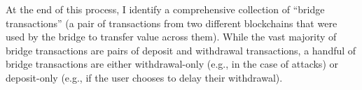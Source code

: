   At the end of this process, I identify a comprehensive collection
  of ``bridge transactions'' (a pair of transactions from two
  different blockchains that were used by the bridge to transfer
  value across them). While the vast majority of bridge transactions
  are pairs of deposit and withdrawal transactions, a handful of
  bridge transactions are either withdrawal-only (e.g., in the case of
  attacks) or deposit-only (e.g., if the user chooses to delay their
  withdrawal).











